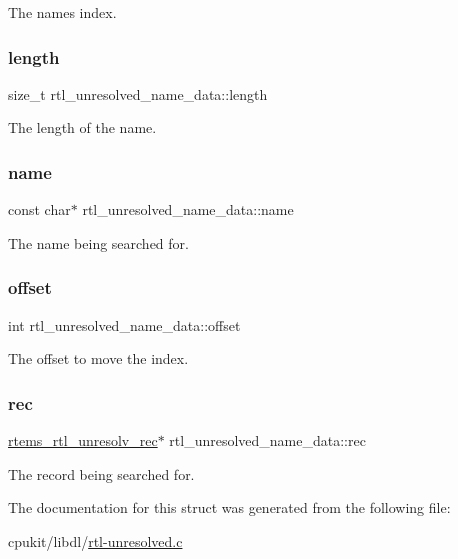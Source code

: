 The name\textquotesingle{}s index. \mbox{\label{structrtl__unresolved__name__data_a9268dd02386e0a939df48e7e1c76a15c}} 
\subsubsection{\texorpdfstring{length}{length}}
{\footnotesize\ttfamily size\+\_\+t rtl\+\_\+unresolved\+\_\+name\+\_\+data\+::length}

The length of the name. \mbox{\label{structrtl__unresolved__name__data_aee463e55e1ac39fe468d6c285a29ed08}} 
\subsubsection{\texorpdfstring{name}{name}}
{\footnotesize\ttfamily const char$\ast$ rtl\+\_\+unresolved\+\_\+name\+\_\+data\+::name}

The name being searched for. \mbox{\label{structrtl__unresolved__name__data_a573f1def9ce28fb9eb7b86b3cfdc0b49}} 
\subsubsection{\texorpdfstring{offset}{offset}}
{\footnotesize\ttfamily int rtl\+\_\+unresolved\+\_\+name\+\_\+data\+::offset}

The offset to move the index. \mbox{\label{structrtl__unresolved__name__data_a5d26c0e62b93b105cf6fe26b39d4ce4a}} 
\subsubsection{\texorpdfstring{rec}{rec}}
{\footnotesize\ttfamily \mbox{\hyperlink{structrtems__rtl__unresolv__rec}{rtems\+\_\+rtl\+\_\+unresolv\+\_\+rec}}$\ast$ rtl\+\_\+unresolved\+\_\+name\+\_\+data\+::rec}

The record being searched for. 

The documentation for this struct was generated from the following file\+:\begin{DoxyCompactItemize}
\item 
cpukit/libdl/\mbox{\hyperlink{rtl-unresolved_8c}{rtl-\/unresolved.\+c}}\end{DoxyCompactItemize}
